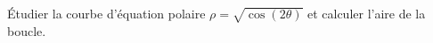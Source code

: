 \begin{enonce}
\begin{exercise}[ID={RMS119/688 Mines-Ponts PSI},subtitle={},tags={}]
Étudier la courbe d'équation polaire $\rho=\sqrt{\cos(2\theta)}$ et calculer l'aire de la boucle.
\end{exercise}
\begin{solution}
\end{solution}
\end{enonce}
